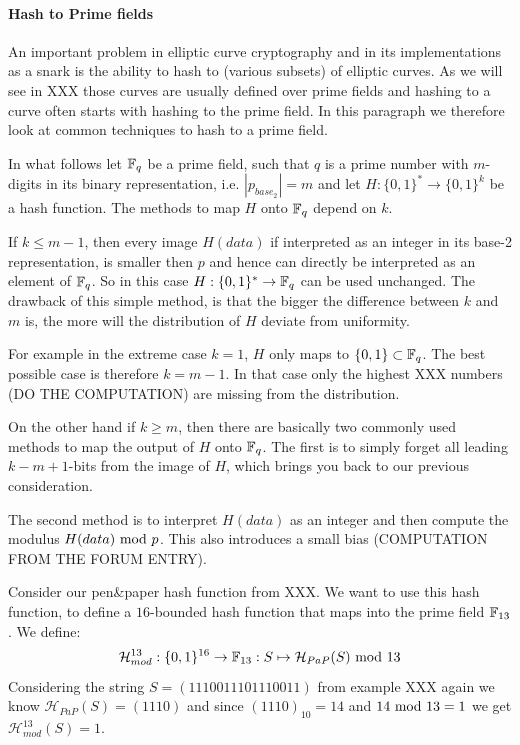 \paragraph{Hash to Prime fields} 
An important problem in elliptic curve cryptography and in its implementations as a snark is the ability to hash to (various subsets) of elliptic curves. As we will see in XXX those curves are usually defined over prime fields and hashing to a curve often starts with hashing to the prime field. In this paragraph we therefore look at common techniques to hash to a prime field.

In what follows let $\mathbb{F}_{q}$ be a prime field, such that $q$ is a prime number with $m$-digits in its binary representation, i.e. $|p_{base_2}|=m$ and let $H:\{0,1\}^* \to \{0,1\}^k$ be a hash function. The methods to map $H$ onto $\mathbb{F}_{q}$ depend on $k$. 

If $k\leq m-1$, then every image $H(data)$ if interpreted as an integer in its base-2 representation, is smaller then $p$ and hence can directly be interpreted as an element of $\mathbb{F}_{q}$. So in this case $H:\{0,1\}^* \to \mathbb{F}_q$ can be used unchanged. The drawback of this simple method, is that the bigger the difference between $k$ and $m$ is, the more will the distribution of $H$ deviate from uniformity.

For example in the extreme case $k=1$, $H$ only maps to $\{0,1\}\subset \mathbb{F}_q$. The best possible case is therefore $k=m-1$. In that case only the highest XXX numbers (DO THE COMPUTATION) are missing from the distribution.

On the other hand if $k\geq m$, then there are basically two commonly used methods to map the output of $H$ onto $\mathbb{F}_q$. The first is to simply forget all leading $k-m+1$-bits from the image of $H$, which brings you back to our previous consideration.

The second method is to interpret $H(data)$ as an integer and then compute the modulus $ H(data) \text{ mod } p$. This also introduces a small bias (COMPUTATION FROM THE FORUM ENTRY). 

\begin{example}
Consider our pen\&paper hash function from XXX. We want to use this hash function, to define a $16$-bounded hash function that maps into the prime field $\mathbb{F}_{13}$. We define:
$$
\mathcal{H}_{mod}^{13}: \{0,1\}^{16}\to \mathbb{F}_{13}: S \mapsto \mathcal{H}_{PaP}(S) \text{ mod } 13
$$
Considering the string $S=(1110011101110011)$ from example XXX again we know $\mathcal{H}_{PaP}(S)=(1110)$ and since $(1110)_{10}=14$ and $14 \text{ mod } 13=1$ we get $\mathcal{H}_{mod}^{13}(S)=1$.
\end{example}

